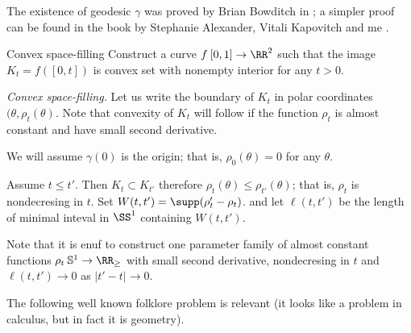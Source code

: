 The existence of geodesic $\gamma$ was proved by Brian Bowditch in \cite{bowditch};
a simpler proof can be found in the book 
by Stephanie Alexander, Vitali Kapovitch and me \cite[see][]{akp}.















\begin{pr}{\thm}{Convex space-filling}\label{Convex space-filling}
Construct a curve $f\:[0,1]\to \RR^2$
such that 
the image $K_t=f([0,t])$ is convex set with nonempty interior
for any $t>0$. 
\end{pr}

\textit{Convex space-filling.}
Let us write the boundary of $K_t$
in polar coordinates $(\theta,\rho_t(\theta)$.
Note that convexity of $K_t$ will follow if the function $\rho_t$ is almost constant and have small second derivative.

We will assume $\gamma(0)$ is the origin;
that is, $\rho_0(\theta)=0$ for any $\theta$.

Assume $t\le t'$.
Then $K_t\subset K_{t'}$ 
therefore 
$\rho_t(\theta)\le \rho_{t'}(\theta)$;
that is, $\rho_t$ is nondecresing in $t$.
Set $W(t,t')=\supp(\rho_t'-\rho_t)$.
and let $\ell(t,t')$ be the length of minimal inteval in $\SS^1$ containing $W(t,t')$.

Note that it is enuf to construct one parameter family of almost constant functions $\rho_t\:\mathbb{S}^1\to \RR_\ge$
with small second derivative,
nondecresing in $t$ and $\ell(t,t')\to 0$ as $|t'-t|\to 0$.















The following well known folklore problem is relevant
(it looks like a problem in calculus, but in fact it is geometry).

